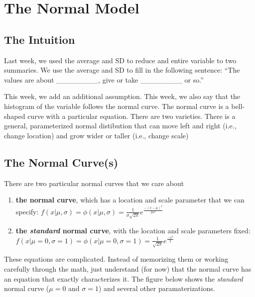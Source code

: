 \documentclass[]{book}
\providecommand{\tightlist}{%
  \setlength{\itemsep}{0pt}\setlength{\parskip}{0pt}}
\begin{document}
\hypertarget{the-normal-model}{%
\chapter{The Normal Model}\label{the-normal-model}}

\hypertarget{the-intuition-1}{%
\section{The Intuition}\label{the-intuition-1}}

Last week, we used the average and SD to reduce and entire variable to two summaries. We use the average and SD to fill in the following sentence: ``The values are about \_\_\_\_\_\_\_\_, give or take \_\_\_\_\_\_\_\_ or so.''

This week, we add an additional assumption. This week, we also say that the histogram of the variable follows the normal curve. The normal curve is a bell-shaped curve with a particular equation. There are two varieties. There is a general, parameterized normal distibution that can move left and right (i.e., change location) and grow wider or taller (i.e., change scale)

\hypertarget{the-normal-curves}{%
\section{The Normal Curve(s)}\label{the-normal-curves}}

There are two particular normal curves that we care about

\begin{enumerate}
\def\labelenumi{\arabic{enumi}.}
\tightlist
\item
  \textbf{the normal curve}, which has a location and scale parameter that we can specify: \(f(x | \mu, \sigma) = \phi(x | \mu, \sigma) = \frac{1}{{\sigma \sqrt {2\pi } }}e^\frac{{ - \left( {x - \mu } \right)^2 }}{2\sigma ^2 }\)
\item
  \textbf{the \emph{standard} normal curve}, with the location and scale parameters fixed: \(f(x | \mu = 0, \sigma = 1) = \phi(x | \mu = 0, \sigma = 1) = \frac{1}{{\sqrt {2\pi } }}e^\frac{{ - x ^2 }}{2}\)
\end{enumerate}

These equations are complicated. Instead of memorizing them or working carefully through the math, just understand (for now) that the normal curve has an equation that exactly characterizes it. The figure below shows the \emph{standard} normal curve (\(\mu = 0\) and \(\sigma = 1\)) and several other paramaterizations.
\end{document}
